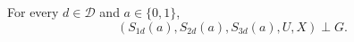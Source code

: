 For every \(d\in\mathcal D\) and \(a\in\{0,1\}\),
\[
  (S_{1d}(a),S_{2d}(a),S_{3d}(a),U,X)\perp G.
\]